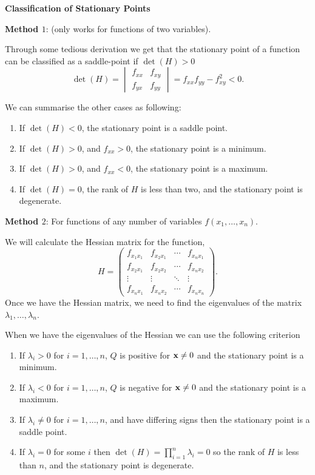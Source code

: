 \documentclass[10pt, a4paper]{article}
\begin{document}
\textbf{Classification of Stationary Points}

\textbf{Method $1$}:
(only works for functions of two variables).

Through some tedious derivation we get that the stationary point of a function can be classified as a saddle-point if $\det(H) > 0$
\[
\det(H) = \begin{vmatrix}
    f_{xx} & f_{xy} \\
    f_{yx} & f_{yy}
\end{vmatrix} = f_{xx}f_{yy} - f_{xy} ^ 2 < 0.
\]

We can summarise the other cases as following:
\begin{enumerate}[label = (\arabic*)]
    \item If $\det(H) < 0$,
    the stationary point is a saddle point.

    \item If $\det(H) > 0$,
    and $f_{xx} > 0$,
    the stationary point is a minimum.

    \item If $\det(H) > 0$,
    and $f_{xx} < 0$,
    the stationary point is a maximum.

    \item If $\det(H) = 0$,
    the rank of $H$ is less than two,
    and the stationary point is degenerate.
\end{enumerate}


\textbf{Method $2$}:
For functions of any number of variables $f(x_1, \dotsc, x_n)$.

We will calculate the Hessian matrix for the function,
\[
H = \begin{pmatrix}
    f_{x_1x_1} & f_{x_2x_1} & \dotsi & f_{x_nx_1} \\
    f_{x_2x_1} & f_{x_2x_2} & \dotsi & f_{x_nx_2} \\
    \vdots & \vdots & \ddots & \vdots \\
    f_{x_nx_1} & f_{x_nx_2} & \dotsi & f_{x_nx_n}
\end{pmatrix}.
\]
Once we have the Hessian matrix,
we need to find the eigenvalues of the matrix $\lambda_1, \dotsc, \lambda_n$.

When we have the eigenvalues of the Hessian we can use the following criterion
\begin{enumerate}[label = (\arabic*)]
    \item If $\lambda_i > 0$ for $i = 1, \dotsc, n$,
    $Q$ is positive for $\mathbf{x} \neq 0$ and the stationary point is a minimum.
    
    \item If $\lambda_i < 0$ for $i = 1, \dotsc, n$,
    $Q$ is negative for $\mathbf{x} \neq 0$ and the stationary point is a maximum.
    
    \item If $\lambda_i \neq 0$ for $i = 1, \dotsc, n$,
    and have differing signs then the stationary point is a saddle point.

    \item If $\lambda_i = 0$ for some $i$ then $\det(H) = \prod_{i = 1}^{n}\lambda_i = 0$ so the rank of $H$ is less than $n$,
    and the stationary point is degenerate.
\end{enumerate}
\end{document}
